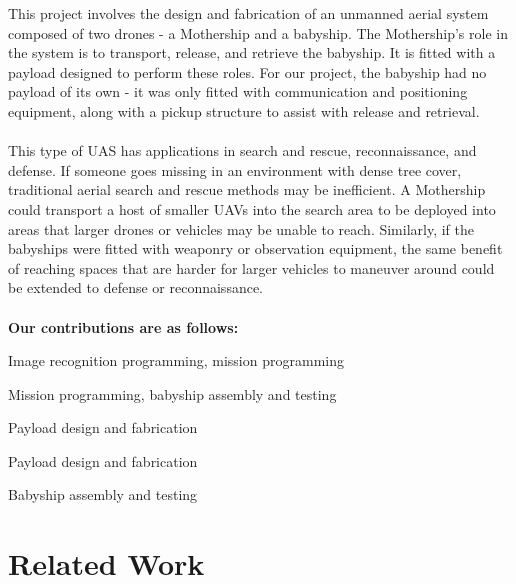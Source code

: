 \documentclass[11pt]{article}
\begin{document}
This project involves the design and fabrication of an unmanned aerial system composed of two drones - a Mothership and a babyship. The Mothership’s role in the system is to transport, release, and retrieve the babyship. It is fitted with a payload designed to perform these roles. For our project, the babyship had no payload of its own - it was only fitted with communication and positioning equipment, along with a pickup structure to assist with release and retrieval.\\\\
\noindent
This type of UAS has applications in search and rescue, reconnaissance, and defense. If someone goes missing in an environment with dense tree cover, traditional aerial search and rescue methods may be inefficient. A Mothership could transport a host of smaller UAVs into the search area to be deployed into areas that larger drones or vehicles may be unable to reach. Similarly, if the babyships were fitted with weaponry or observation equipment, the same benefit of reaching spaces that are harder for larger vehicles to maneuver around could be extended to defense or reconnaissance.\\\\
\textbf{Our contributions are as follows:}
\begin{description}
    \addtolength{\itemindent}{1.0cm} 
    \item[Robby Rivenbark] Image recognition programming, mission programming
    \item[Alex Pendergast] Mission programming, babyship assembly and testing
    \item[Dallin Yost] Payload design and fabrication
    \item[Jake Carter] Payload design and fabrication
    \item[Daniel Smith] Babyship assembly and testing
\end{description} 
\section{Related Work}
\end{document}
